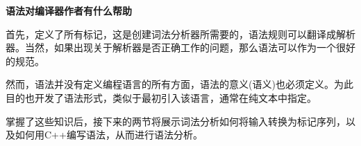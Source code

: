 \hspace*{\fill} \par %
\textbf{语法对编译器作者有什么帮助}

首先，定义了所有标记，这是创建词法分析器所需要的，语法规则可以翻译成解析器。当然，如果出现关于解析器是否正确工作的问题，那么语法可以作为一个很好的规范。\par

然而，语法并没有定义编程语言的所有方面，语法的意义(语义)也必须定义。为此目的也开发了语法形式，类似于最初引入该语言，通常在纯文本中指定。\par

掌握了这些知识后，接下来的两节将展示词法分析如何将输入转换为标记序列，以及如何用C++编写语法，从而进行语法分析。\par

























